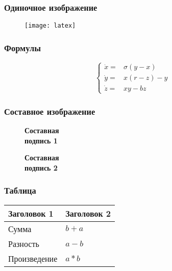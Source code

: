 \begin{frame}
\frametitle{Одиночное изображение}
\begin{figure}[H]
  \center
  \texttt{[image: latex]}
\end{figure}
\end{frame}

\begin{frame}
\frametitle{Формулы}
$$
\left\{
  \begin{array}{rl}
    \dot x = & \sigma (y-x) \\
    \dot y = & x (r - z) - y \\
    \dot z = & xy - bz
  \end{array}
\right.
$$
\end{frame}

\begin{frame}
\frametitle{Составное изображение}
\begin{figure}[h]
  \begin{minipage}[h]{0.47\linewidth}
    \textbf{Составная \\ подпись 1}
  \end{minipage}
  \hfill
  \begin{minipage}[h]{0.47\linewidth}
    \textbf{Составная \\ подпись 2}
  \end{minipage}
\end{figure}
\end{frame}

\begin{frame}
\frametitle{Таблица}
\begin{tabular}{|l|l|}
\hline
\textbf{Заголовок 1} & \textbf{Заголовок 2} \\
\hline
Сумма & $b+a$ \\
\hline
Разность & $a-b$ \\
\hline
Произведение & $a*b$ \\
\hline
\end{tabular}
\end{frame}

